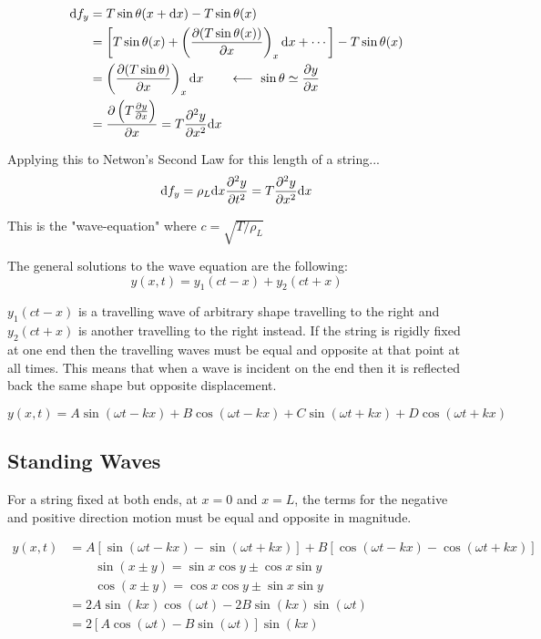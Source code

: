 \documentclass[10pt, a4paper]{article}
\newcommand{\larr}{\ensuremath{\longleftarrow\ }}
\begin{document}
\begin{equation*}
\begin{aligned}
\dd f_y &= T \sin \theta(x+\dd x) - T\sin \theta (x)
\\ &= \left[ T \sin \theta (x) +
\left( \pdv{(T \sin \theta (x))}{x} \right) _x \dd x
+ \cdots \right] - T \sin \theta (x)
\\ & = \left( \pdv{(T \sin \theta )}{x} \right) _x \dd x
\qquad \larr \sin \theta \simeq \pdv{y}{x}
\\ &= \pdv{\left( T \pdv{y}{x} \right)}{x} = T \pdv[2]{y}{x} \dd x
\end{aligned}
\end{equation*}

Applying this to Netwon's Second Law for this length of a string...
\[ \dd f _y= \rho _L \dd x \pdv[2]{y}{t}
= T \pdv[2]{y}{x} \dd x \]

This is the "wave-equation" where $c = \sqrt{T/\rho _L} $


The general solutions to the wave equation are the following:
\[ y(x,t) = y_1 (ct - x) + y_2 (ct + x) \]

$y_1 (ct - x)$ is a travelling wave of arbitrary shape travelling to the right and $y_2 (ct + x)$ is another travelling to the right instead. If the string is rigidly fixed at one end then the travelling waves must be equal and opposite at that point at all times. This means that when a wave is incident on the end then it is reflected back the same shape but opposite displacement.

\[
y(x,t) = A \sin (\omega t - kx) + B \cos (\omega t - kx)
+ C \sin (\omega t + kx) + D \cos (\omega t + kx)
\]

\subsection{Standing Waves}

For a string fixed at both ends, at $x= 0$ and $x=L$, the terms for the negative and positive direction motion must be equal and opposite in magnitude.

\begin{equation*}
\begin{aligned}
y(x,t) &= A[\sin(\omega t - kx ) - \sin (\omega t + kx)]
+ B[\cos(\omega t - kx ) - \cos (\omega t + kx)]
\\ & \qquad \sin (x \pm y) = \sin x \cos y \pm \cos x \sin y
\\ & \qquad \cos (x \pm y) = \cos x \cos y \pm \sin x \sin y
\\ &= 2A \sin (kx) \cos (\omega t)
- 2 B \sin (kx) \sin (\omega t)
\\ &= 2[A \cos (\omega t) - B \sin (\omega t)] \sin (kx)
\end{aligned}
\end{equation*}
\end{document}
